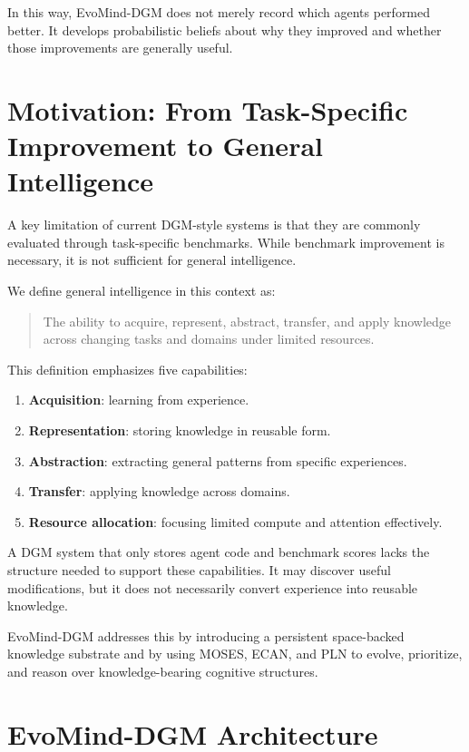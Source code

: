\documentclass[11pt]{article}
\begin{document}
In this way, EvoMind-DGM does not merely record which agents performed better. It develops probabilistic beliefs about why they improved and whether those improvements are generally useful.

\section{Motivation: From Task-Specific Improvement to General Intelligence}

A key limitation of current DGM-style systems is that they are commonly evaluated through task-specific benchmarks. While benchmark improvement is necessary, it is not sufficient for general intelligence.

We define general intelligence in this context as:

\begin{quote}
The ability to acquire, represent, abstract, transfer, and apply knowledge across changing tasks and domains under limited resources.
\end{quote}

This definition emphasizes five capabilities:

\begin{enumerate}[leftmargin=*]
    \item \textbf{Acquisition}: learning from experience.
    \item \textbf{Representation}: storing knowledge in reusable form.
    \item \textbf{Abstraction}: extracting general patterns from specific experiences.
    \item \textbf{Transfer}: applying knowledge across domains.
    \item \textbf{Resource allocation}: focusing limited compute and attention effectively.
\end{enumerate}

A DGM system that only stores agent code and benchmark scores lacks the structure needed to support these capabilities. It may discover useful modifications, but it does not necessarily convert experience into reusable knowledge.

EvoMind-DGM addresses this by introducing a persistent space-backed knowledge substrate and by using MOSES, ECAN, and PLN to evolve, prioritize, and reason over knowledge-bearing cognitive structures.

\section{EvoMind-DGM Architecture}
\end{document}
